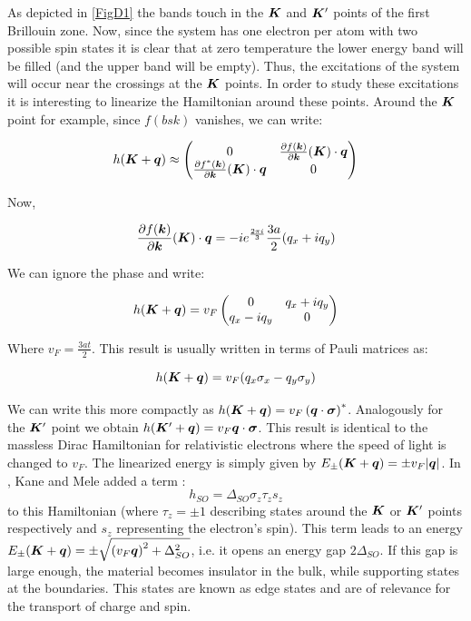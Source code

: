 As depicted in \ref{FigD1} the bands touch in the $\boldsymbol{K}$ and $\boldsymbol{K}'$ points of the first Brillouin zone. Now, since the system has one electron per atom with two possible spin states it is clear that at zero temperature the lower energy band will be filled (and the upper band will be empty). Thus, the excitations of the system will occur near the crossings at the $\boldsymbol{K}$ points. In order to study these excitations it is interesting to linearize the Hamiltonian around these points. Around the $\boldsymbol{K}$ point for example, since $f(bs{k})$ vanishes, we can write:

\begin{equation}
h(\boldsymbol{K}+\boldsymbol{q}) \approx \begin{pmatrix}
    0 & \frac{\partial f(\boldsymbol{k})}{\partial \boldsymbol{k}}(\boldsymbol{K})\cdot\boldsymbol{q} \\
    \frac{\partial f^*(\boldsymbol{k})}{\partial \boldsymbol{k}}(\boldsymbol{K})\cdot\boldsymbol{q} & 0
\end{pmatrix}
\end{equation}

Now, 

\begin{equation}
\frac{\partial f(\boldsymbol{k})}{\partial \boldsymbol{k}}(\boldsymbol{K})\cdot\boldsymbol{q} = -ie^{\frac{2\pi i}{3}} \frac{3a}{2}(q_x+iq_y)
\end{equation}

We can ignore the phase and write:

\begin{equation}
h(\boldsymbol{K}+\boldsymbol{q}) = v_F \begin{pmatrix}
    0 & q_x+iq_y \\
    q_x-iq_y & 0
\end{pmatrix}
\end{equation}

Where $v_F = \frac{3at}{2}$. This result is usually written in terms of Pauli matrices as:

\begin{equation}
h(\boldsymbol{K}+\boldsymbol{q}) = v_F(q_x\sigma_x-q_y\sigma_y)
\end{equation}

We can write this more compactly as $h(\boldsymbol{K}+\boldsymbol{q}) = v_F \left(\boldsymbol{q}\cdot\boldsymbol{\sigma}\right)^*$. Analogously for the $\boldsymbol{K}'$ point we obtain $h(\boldsymbol{K}'+\boldsymbol{q}) = v_F\boldsymbol{q}\cdot\boldsymbol{\sigma}$. This result is identical to the massless Dirac Hamiltonian for relativistic electrons where the speed of light is changed to $v_F$. The linearized energy is simply given by $E_{\pm}(\boldsymbol{K}+\boldsymbol{q}) = \pm v_F|\boldsymbol{q}|$. In \cite{Kane2005}, Kane and Mele added a term :
\begin{equation}
h_{SO} = \Delta_{SO}\sigma_z\tau_z s_z
\end{equation} 
to this Hamiltonian (where $\tau_z = \pm 1$ describing states around the $\boldsymbol{K}$ or $\boldsymbol{K}'$ points respectively and $s_z$ representing the electron's spin). This term leads to an energy $E_{\pm}(\boldsymbol{K}+\boldsymbol{q}) = \pm \sqrt{\left(v_F\boldsymbol{q} \right)^2 + \Delta_{SO}^2}$, i.e. it opens an energy gap $2\Delta_{SO}$. If this gap is large enough, the material becomes insulator in the bulk, while supporting states at the boundaries. This states are known as edge states and are of relevance for the transport of charge and spin.
